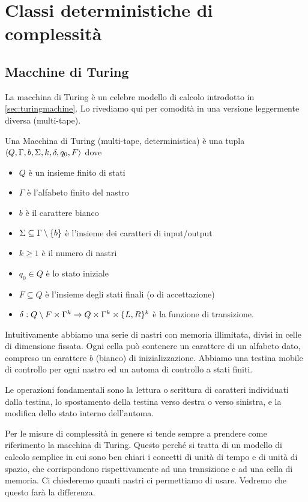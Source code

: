 \chapter{Classi deterministiche di complessità}

\section{Macchine di Turing}

La macchina di Turing è un celebre modello di calcolo introdotto in \ref{sec:turingmachine}. Lo
rivediamo qui per comodità in una versione leggermente diversa (multi-tape).

\begin{defn}
    Una Macchina di Turing (multi-tape, deterministica) è una tupla $\langle Q, \Gamma, b, \Sigma,
    k, \delta, q_{0}, F \rangle$ dove
    \begin{itemize}
        \item $Q$ è un insieme finito di stati
        \item $\Gamma$ è l'alfabeto finito del nastro
        \item $b$ è il carattere bianco
        \item $\Sigma \subseteq \Gamma \setminus \{b\}$ è l'insieme dei caratteri di input/output
        \item $k \geq 1$ è il numero di nastri
        \item $q_{0} \in Q$ è lo stato iniziale
        \item $F \subseteq Q$ è l'insieme degli stati finali (o di accettazione)
        \item $\delta: Q \setminus F \times \Gamma^{k} \to Q \times \Gamma^{k} \times
        \{L,R\}^{k}$ è la funzione di transizione.
    \end{itemize}
\end{defn}

Intuitivamente abbiamo una serie di nastri con memoria illimitata, divisi in celle di dimensione
fissata. Ogni cella può contenere un carattere di un alfabeto dato, compreso un carattere $b$
(bianco) di inizializzazione. Abbiamo una testina mobile di controllo per ogni nastro ed un automa
di controllo a stati finiti.

Le operazioni fondamentali sono la lettura o scrittura di caratteri individuati dalla testina, lo
spostamento della testina verso destra o verso sinistra, e la modifica dello stato interno
dell'automa.

Per le misure di complessità in genere si tende sempre a prendere come riferimento la macchina di
Turing. Questo perché si tratta di un modello di calcolo semplice in cui sono ben chiari i concetti
di unità di tempo e di unità di spazio, che corrispondono rispettivamente ad una transizione e ad
una cella di memoria.  Ci chiederemo quanti nastri ci permettiamo di usare. Vedremo che questo farà
la differenza.


